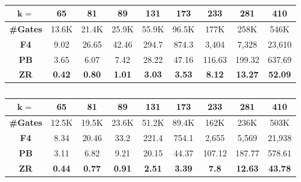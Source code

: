 \documentclass[journal, onecolumn]{IEEEtran}
\begin{document}
\clearpage

\begin{center}

\begin{table}[ht!]
\centering
\caption{}
\label{rhsmpo}
\begin{tabular}{| c | c | c | c | c | c | c | c | c |} \hline
$\boldsymbol{k=}$&65&81&89&131&173&233&281&410 \\ \hline
\textbf{\#Gates} & 13.6K&21.4K & 25.9K& 55.9K &96.5K&177K&258K&546K\\ \hhline{|=|=|=|=|=|=|=|=|=|}
\textbf{F4\cite{pruss:tcad}} &9.02 &26.65 & 42.46&294.7&874.3&3,404&7,328&23,610 \\ \hline
\textbf{PB}  &3.65 &6.07 & 7.42&28.22 &47.16&116.63&199.32&637.69\\ \hline
\textbf{ZR}  & \textbf{0.42}& \textbf{0.80}&\textbf{1.01} & \textbf{3.03}&\textbf{3.53}&
\textbf{8.12}&\textbf{13.27}&\textbf{52.09}\\ \hline
\end{tabular}
\end{table}

\end{center}

\clearpage

\begin{center}

\begin{table}[ht!]
\centering
\caption{}
\label{agsmpo}
\begin{tabular}{| c | c | c | c | c | c | c | c | c |} \hline
$\boldsymbol{k=}$&65&81&89&131&173&233&281&410 \\ \hline
\textbf{\#Gates} &12.5K & 19.5K&23.6K&51.2K&89.4K&162K&236K&503K \\ \hhline{|=|=|=|=|=|=|=|=|=|}
\textbf{F4\cite{pruss:tcad}} &8.34 &20.46 &33.2&221.4&754.1&2,655&5,569&21,938\\ \hline
\textbf{PB} &3.11 & 6.82& 9.21& 20.15&44.37&107.12&187.77&578.61\\ \hline
\textbf{ZR} &\textbf{0.44} &\textbf{0.77} &\textbf{0.91}& \textbf{2.51}&\textbf{3.39}&
\textbf{7.8}&\textbf{12.63}&\textbf{43.78}\\ \hline
\end{tabular}
\end{table}

\end{center}

\clearpage

\end{document}
